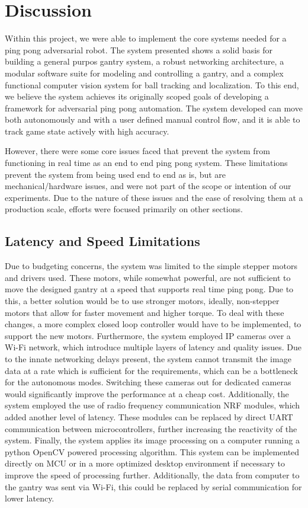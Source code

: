 \chapter{Discussion}
Within this project, we were able to implement the core systems needed for a ping pong adversarial robot. The system presented shows a solid basis for building a general purpos gantry system, a robust networking architecture, a modular software suite for modeling and controlling a gantry, and a complex functional computer vision system for ball tracking and localization. To this end, we believe the system achieves its originally scoped goals of developing a framework for adversarial ping pong automation. The system developed can move both autonomously and with a user defined manual control flow, and it is able to track game state actively with high accuracy.

 However, there were some core issues faced that prevent the system from functioning in real time as an end to end ping pong system. These limitations prevent the system from being used end to end as is, but are mechanical/hardware issues, and were not part of the scope or intention of our experiments. Due to the nature of these issues and the ease of resolving them at a production scale, efforts were focused primarily on other sections.

\section{Latency and Speed Limitations}
Due to budgeting concerns, the system was limited to the simple stepper motors and drivers used. These motors, while somewhat powerful, are not sufficient to move the designed gantry at a speed that supports real time ping pong. Due to this, a better solution would be to use stronger motors, ideally, non-stepper motors that allow for faster movement and higher torque. To deal with these changes, a more complex closed loop controller would have to be implemented, to support the new motors.
Furthermore, the system employed IP cameras over a Wi-Fi network, which introduce multiple layers of latency and quality issues. Due to the innate networking delays present, the system cannot transmit the image data at a rate which is sufficient for the requirements, which can be a bottleneck for the autonomous modes. Switching these cameras out for dedicated cameras would significantly improve the performance at a cheap cost.
Additionally, the system employed the use of radio frequency communication NRF modules, which added another level of latency. These modules can be replaced by direct UART communication between microcontrollers, further increasing the reactivity of the system.
Finally, the system applies its image processing on a computer running a python OpenCV powered processing algorithm. This system can be implemented directly on MCU or in a more optimized desktop environment if necessary to improve the speed of processing further. Additionally, the data from computer to the gantry was sent via Wi-Fi, this could be replaced by serial communication for lower latency.

